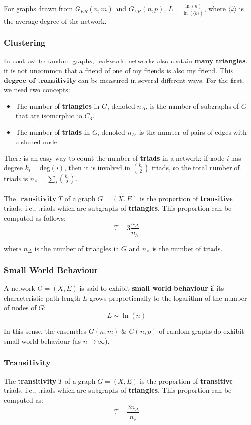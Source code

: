 \documentclass[a4paper,11pt]{article}
\begin{document}
For graphs drawn from $G_{ER}(n,m)$ and $G_{ER}(n,p)$, $L = \frac{\ln(n)}{\ln( \langle k \rangle)}$, where $\langle k \rangle$ is the average degree of the network.

\subsubsection{Clustering}
In contrast to random graphs, real-world networks also contain \textbf{many triangles}: it is not uncommon that a friend of one of my friends is also my friend.
This \textbf{degree of transitivity} can be measured in several different ways.
For the first, we need two concepts:
\begin{itemize}
    \item   The number of \textbf{triangles} in $G$, denoted $n_\Delta$, is the number of subgraphs of $G$ that are isomorphic to $C_3$.
    \item   The number of \textbf{triads} in $G$, denoted $n_\land$, is the number of pairs of edges with a shared node.
\end{itemize}

There is an easy way to count the number of \textbf{triads} in a network:
if node $i$ has degree $k_i = \text{deg}(i)$, then it is involved in $\binom{k_i}{2}$ triads,
so the total number of triads is $n_\land = \sum_i \binom{k_i}{2}$.
\\\\
The \textbf{transitivity} $T$ of a graph $G = (X,E)$ is the proportion of \textbf{transitive} triads, i.e., triads which are subgraphs of \textbf{triangles}.
This proportion can be computed as follows:
\[
    T = 3 \frac{n_\Delta}{n_\land}
\]

where $n_\Delta$ is the number of triangles in $G$ and $n_\land$ is the number of triads. 

\subsubsection{Small World Behaviour}
A network $G = (X,E)$ is said to exhibit \textbf{small world behaviour} if its characteristic path length $L$ grows proportionally to the logarithm of the number of nodes of $G$:
\[
    L \sim \ln(n)
\]

In this sense, the ensembles $G(n,m)$ \& $G(n,p)$ of random graphs do exhibit small world behaviour (as $n \to \infty$).

\subsubsection{Transitivity}
The \textbf{transitivity} $T$ of a graph $G=(X,E)$ is the proportion of \textbf{transitive} triads, i.e., triads which are subgraphs of \textbf{triangles}.
This proportion can be computed as:
\[
    T = \frac{3n_\Delta}{n_\land}
\]
\end{document}
